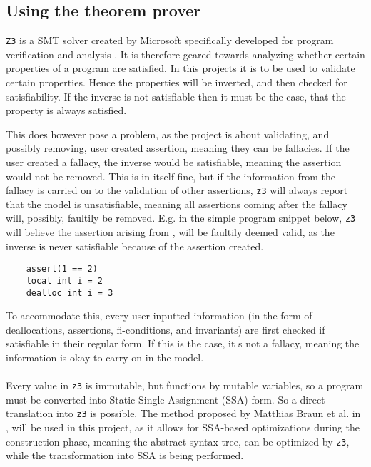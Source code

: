 \subsection{Using the theorem prover }
\texttt{Z3} is a SMT solver created by Microsoft specifically developed
for program verification and analysis \cite{z3:microsoft}. It is therefore geared towards
analyzing whether certain properties of a program are satisfied. In this projects it is to be
used to validate certain properties. Hence the properties will be inverted, and then checked for
satisfiability. If the inverse is not satisfiable then it must be the case, that the property
is always satisfied.

This does however pose a problem, as the project is about validating, and possibly removing,
user created assertion, meaning they can be fallacies. If the user created a fallacy, the inverse
would be satisfiable, meaning the assertion would not be removed. This is in itself fine, but if
the information from the fallacy is carried on to the validation of other assertions, \texttt{z3}
will always report that the model is unsatisfiable, meaning all assertions coming after the fallacy
will, possibly, faultily be removed. E.g. in the simple program snippet below, \texttt{z3} will
believe the assertion arising from , will be faultily deemed valid, as the
inverse is never satisfiable because of the assertion created.

\begin{lstlisting}
    assert(1 == 2)
    local int i = 2
    dealloc int i = 3
\end{lstlisting}
\noindent
To accommodate this, every user inputted information (in the form of deallocations, assertions,
fi-conditions, and invariants) are first checked if satisfiable in their regular form. If this is
the case, it s not a fallacy, meaning the information is okay to carry on in the model.
\\
\\
Every value in \texttt{z3} is immutable, but \lan functions by mutable variables, so a \lan program
must be converted into Static Single Assignment (SSA) form. So a direct translation into
\texttt{z3} is possible. The method proposed by Matthias Braun et al. in \cite{SSA}, will be used
in this project, as it allows for SSA-based optimizations during the construction phase, meaning
the abstract syntax tree, can be optimized by \texttt{z3}, while the transformation into SSA is
being performed.

